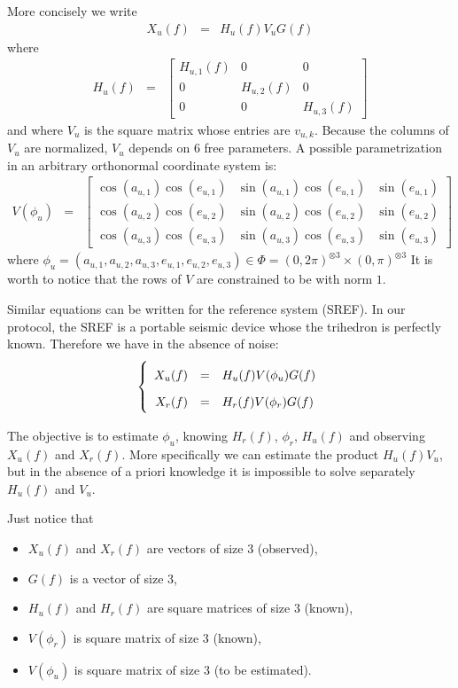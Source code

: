 \documentclass[a4paper, 12pt]{report}
\begin{document}
More concisely we write
\begin{eqnarray*}
X_{u}(f)&=&H_{u}(f)V_{u}G(f)
\end{eqnarray*}
where 
\begin{eqnarray*}
H_{u}(f)&=&
\begin{bmatrix}
H_{u,1}(f)&0&0
\\
0&H_{u,2}(f)&0
\\
0&0&H_{u,3}(f)
\end{bmatrix}
\end{eqnarray*}
and where $V_{u}$ is the square matrix whose entries are $v_{u,k}$. Because the columns of $V_{u}$ are normalized, $V_{u}$ depends on 6 free parameters. A possible parametrization in an arbitrary orthonormal coordinate system is:
\begin{eqnarray}
\label{eq:parametricformofV}
V(\phi_{u})&=&
\begin{bmatrix}
\cos(a_{u,1})\cos(e_{u,1})&\sin(a_{u,1})\cos(e_{u,1})&\sin(e_{u,1})
\\
\cos(a_{u,2})\cos(e_{u,2})&\sin(a_{u,2})\cos(e_{u,2})&\sin(e_{u,2})
\\
\cos(a_{u,3})\cos(e_{u,3})&\sin(a_{u,3})\cos(e_{u,3})&\sin(e_{u,3})
\end{bmatrix}
\end{eqnarray}
where $\phi_{u}=(a_{u,1},a_{u,2},a_{u,3},e_{u,1},e_{u,2},e_{u,3})\in\Phi= (0,2\pi)^{\otimes 3}\times (0,\pi)^{\otimes 3}$
It is worth to notice that the rows of $V$ are constrained to be with norm $1$.


 \bigskip
Similar equations can be written for the reference system (SREF). In our protocol, the  SREF is a portable seismic device whose the trihedron  is perfectly known. 
Therefore we have in the absence of noise:
\begin{eqnarray}
\label{eq:signalmodel}
\left\{
\renewcommand\arraystretch{1.8}
\begin{array}{rcl}
X_{u}(f)&=&H_{u}(f)V(\phi_{u})G(f)
\\
X_{r}(f)&=&H_{r}(f)V(\phi_{r})G(f)
\end{array}
\right.
\end{eqnarray}

The objective is to estimate $\phi_{u}$, knowing $H_{r}(f)$,  $\phi_{r}$, $H_{u}(f)$ and observing $X_{u}(f)$ and $X_{r}(f)$.
More specifically we can estimate the product $H_{u}(f)V_{u}$, but in the absence of a priori knowledge it is impossible to solve separately $H_{u}(f)$ and $V_{u}$.

Just notice that 
\begin{itemize}
\item
$X_{u}(f)$ and $X_{r}(f)$ are vectors of size 3 (observed),
\item
$G(f)$ is a vector of size 3, 
\item
$H_{u}(f)$ and $H_{r}(f)$ are square matrices of size 3 (known),
\item
$V(\phi_{r})$ is square matrix of size 3 (known),
\item
$V(\phi_{u})$ is square matrix of size 3 (to be estimated). 
\end{itemize}
\end{document}
